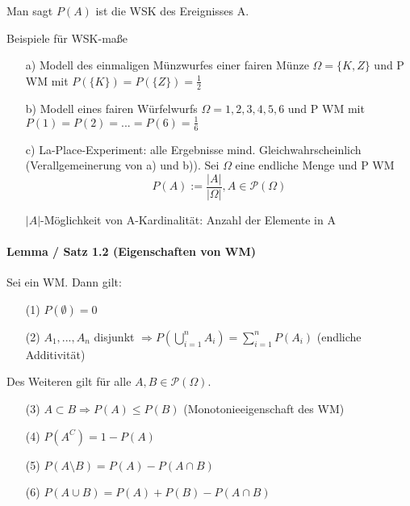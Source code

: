 \documentclass[10pt,a4paper,titlepage]{book}
\begin{document}
Man sagt $P(A)$ ist die WSK des Ereignisses A.

Beispiele für WSK-maße
\begin{itemize}
\item[a)]  Modell des einmaligen Münzwurfes einer fairen Münze
$\Omega = \{K,Z\}$ und P WM mit $P(\{K\}) = P(\{Z\}) = \frac{1}{2}$ 
\item[b)] Modell eines fairen Würfelwurfs $\Omega = {1,2,3,4,5,6}$ und P WM mit $P({1}) = P({2}) = ...  = P({6}) = \frac{1}{6}$
\item[c)] La-Place-Experiment: alle Ergebnisse mind. Gleichwahrscheinlich (Verallgemeinerung von a) und b)). Sei $\Omega$ eine endliche Menge und P WM $$P(A) := \frac{|A|}{|\Omega|}, A \in \mathcal{P}(\Omega)$$

$|A|$-Möglichkeit von A-Kardinalität: Anzahl der Elemente in A
\end{itemize}

\paragraph{Lemma / Satz 1.2 (Eigenschaften von WM)}

Sei \abbildung ein WM. Dann gilt:
\begin{itemize}
\item[(1)]$P(\emptyset) = 0$
\item[(2)]$A_1, ..., A_n$ disjunkt $\Rightarrow P\left(\bigcup_{i=1}^n A_i\right) = \sum_{i=1}^n P(A_i)$ (endliche Additivität)
\end{itemize}
Des Weiteren gilt für alle $A, B \in \mathcal{P}(\Omega)$.

\begin{itemize}
\item[(3)]$A \subset B \Rightarrow P(A) \le P(B)$ (Monotonieeigenschaft des WM)
\item[(4)] $P(A^C) = 1-P(A)$
\item[(5)] $P(A \setminus B) = P(A) - P(A \cap B)$
\item[(6)] $P(A \cup B) = P(A) + P(B) - P(A \cap B)$
\end{itemize}
\end{document}
